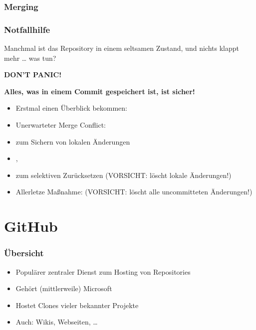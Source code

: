 \documentclass{cms-kurs}
\begin{document}
\begin{frame}
  \frametitle{Merging}

  \onslide<+->


\end{frame}

\begin{frame}
  \frametitle{Notfallhilfe}

  \onslide<+->

  Manchmal ist das Repository in einem seltsamen Zustand, und nichts klappt mehr
  … was tun?

  \onslide<+->

  \begin{center}
    \Large\textcolor{red!80!black}{\textbf{DON'T PANIC!}}
  \end{center}

  \smallskip{}

  \textbf{Alles, was in einem Commit gespeichert ist, ist sicher!}

  \medskip{}

  \begin{itemize}[<+->]
  \item Erstmal einen Überblick bekommen: 
  \item Unerwarteter Merge Conflict: 
  \item {} zum Sichern von lokalen Änderungen
  \item {}, 
  \item {} zum selektiven Zurücksetzen (VORSICHT:
    löscht lokale Änderungen!)
  \item Allerletze Maßnahme:  (VORSICHT: löscht alle
    uncommitteten Änderungen!)
  \end{itemize}

\end{frame}


\section{GitHub}

\begin{frame}
  \frametitle{Übersicht}

  \onslide<+->

  \begin{itemize}
  \item Populärer zentraler Dienst zum Hosting von Repositories
  \item Gehört (mittlerweile) Microsoft
  \item Hostet Clones vieler bekannter Projekte
  \item Auch: Wikis, Webseiten, …
  \end{itemize}

\end{frame}
\end{document}
